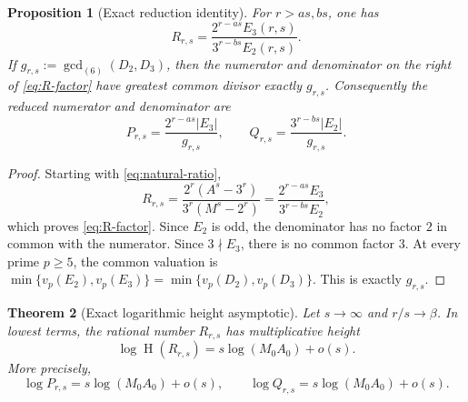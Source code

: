 \documentclass[11pt,oneside]{article}
\newtheorem{theorem}{Theorem}[section]
\newtheorem{proposition}[theorem]{Proposition}
\theoremstyle{definition}
\newcommand{\height}{\operatorname{H}}
\begin{document}
\begin{proposition}[Exact reduction identity]\label{prop:exact-reduction}
For $r>as,bs$, one has
\begin{equation}\label{eq:R-factor}
  R_{r,s}
  =\frac{2^{r-as}E_3(r,s)}{3^{r-bs}E_2(r,s)}.
\end{equation}
If $g_{r,s}:=\gcd_{(6)}(D_2,D_3)$, then the numerator and denominator on
the right of \eqref{eq:R-factor} have greatest common divisor exactly
$g_{r,s}$.  Consequently the reduced numerator and denominator are
\begin{equation}\label{eq:reduced-PQ}
  P_{r,s}=\frac{2^{r-as}|E_3|}{g_{r,s}},
  \qquad
  Q_{r,s}=\frac{3^{r-bs}|E_2|}{g_{r,s}}.
\end{equation}
\end{proposition}

\begin{proof}
Starting with \eqref{eq:natural-ratio},
\[
  R_{r,s}
  =\frac{2^r(A^s-3^r)}{3^r(M^s-2^r)}
  =\frac{2^{r-as}E_3}{3^{r-bs}E_2},
\]
which proves \eqref{eq:R-factor}.  Since $E_2$ is odd, the denominator has
no factor $2$ in common with the numerator.  Since $3\nmid E_3$, there is
no common factor $3$.  At every prime $p\ge5$, the common valuation is
$\min\{v_p(E_2),v_p(E_3)\}=\min\{v_p(D_2),v_p(D_3)\}$.  This is exactly
$g_{r,s}$.
\end{proof}

\begin{theorem}[Exact logarithmic height asymptotic]\label{thm:height-asymptotic}
Let $s\to\infty$ and $r/s\to\beta$.  In lowest terms, the rational number
$R_{r,s}$ has multiplicative height
\begin{equation}\label{eq:height-asymptotic}
  \boxed{\displaystyle
  \log\height(R_{r,s})
  =s\log(M_0A_0)+o(s).}
\end{equation}
More precisely,
\begin{equation}\label{eq:PQ-asymptotic}
  \log P_{r,s}=s\log(M_0A_0)+o(s),
  \qquad
  \log Q_{r,s}=s\log(M_0A_0)+o(s).
\end{equation}
\end{theorem}
\end{document}
